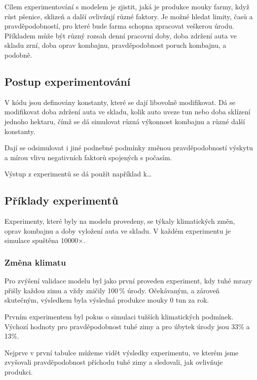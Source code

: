 \documentclass[a4paper, 11pt, hidelinks]{article}
\begin{document}
Cílem experimentování s modelem je zjistit, jaká je produkce mouky farmy, když růst pšenice, sklizeň a další ovlivňují různé faktory.
Je možné hledat limity, časů a pravděpodobností, pro které bude farma schopna zpracovat veškerou úrodu.
Příkladem může být různý rozsah denní pracovní doby, doba zdržení auta ve skladu zrní, doba oprav kombajnu, pravděpodobnost poruch kombajnu, a podobně.

\subsection{Postup experimentování}\label{4_1_postup_exp}

V kódu jsou definovány konstanty, které se dají libovolně modifikovat.
Dá se modifikovat doba zdržení auta ve skladu, kolik auto uveze tun nebo doba sklízení jednoho hektaru, čímž se dá simulovat různá výkonnost kombajnu a různé další konstanty.

Dají se odsimulovat i jiné podnebné podmínky změnou pravděpodobností výskytu a mírou vlivu negativních faktorů spojených s počasím.

Výstup z experimentů se dá použít například k\ldots

\subsection{Příklady experimentů}\label{4_2_priklady}

Experimenty, které byly na modelu provedeny, se týkaly klimatických změn, oprav kombajnu a doby vyložení auta ve skladu.
V každém experimentu je simulace spuštěna 10000$\times$.

\subsubsection{Změna klimatu}\label{4_2_1_zmena}

Pro zvýšení validace modelu byl jako první proveden experiment, kdy tuhé mrazy přišly každou zimu a vždy zničily 100\,\% úrody.
Očekávaným, a zároveň skutečným, výsledkem byla výsledná produkce mouky 0 tun za rok. 

Prvním experimentem byl pokus o simulaci tužších klimatických podmínek.
Výchozí hodnoty pro pravděpodobnost tuhé zimy a pro úbytek úrody jsou 33\% a 13\%.

Nejprve v první tabulce můžeme vidět výsledky experimentu, ve kterém jsme zvyšovali prav\-dě\-po\-dob\-nost příchodu tuhé zimy a sledovali, jak ovlivňuje produkci.
\end{document}
